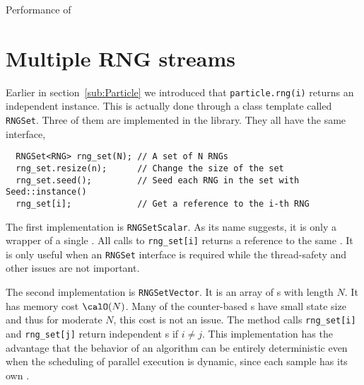 \begin{table}
  \caption{Performance of \protect\mkl{} \protect\rng}
  \label{tab:Performance of MKL RNG}
\end{table}

\section{Multiple RNG streams}
\label{sec:Multiple RNG streams}

Earlier in section~\ref{sub:Particle} we introduced that \verb|particle.rng(i)|
returns an independent \rng instance. This is actually done through a class
template called \verb|RNGSet|. Three of them are implemented in the library.
They all have the same interface,
\begin{Verbatim}
  RNGSet<RNG> rng_set(N); // A set of N RNGs
  rng_set.resize(n);      // Change the size of the set
  rng_set.seed();         // Seed each RNG in the set with Seed::instance()
  rng_set[i];             // Get a reference to the i-th RNG
\end{Verbatim}
The first implementation is \verb|RNGSetScalar|. As its name suggests, it is
only a wrapper of a single \rng. All calls to \verb|rng_set[i]| returns a
reference to the same \rng. It is only useful when an \verb|RNGSet| interface
is required while the thread-safety and other issues are not important.

The second implementation is \verb|RNGSetVector|. It is an array of \rng{}s
with length $N$. It has memory cost $\calO(N)$. Many of the counter-based
\rng{}s have small state size and thus for moderate $N$, this cost is not an
issue. The method calls \verb|rng_set[i]| and \verb|rng_set[j]| return
independent \rng{}s if $i \ne j$. This implementation has the advantage that
the behavior of an algorithm can be entirely deterministic even when the
scheduling of parallel execution is dynamic, since each sample has its own
\rng.

